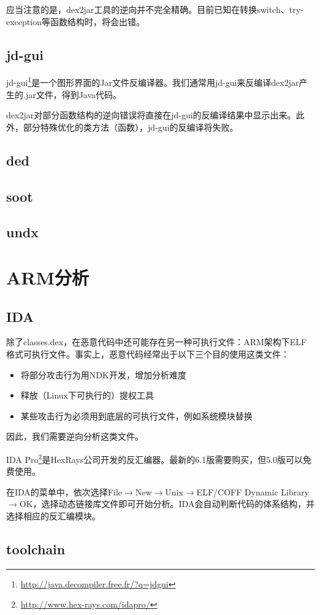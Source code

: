 应当注意的是，dex2jar工具的逆向并不完全精确。目前已知在转换switch、try-exception等函数结构时，将会出错。
\subsection{jd-gui}
jd-gui\footnote{\url{http://java.decompiler.free.fr/?q=jdgui}}是一个图形界面的Jar文件反编译器。我们通常用jd-gui来反编译dex2jar产生的.jar文件，得到Java代码。

dex2jar对部分函数结构的逆向错误将直接在jd-gui的反编译结果中显示出来。此外，部分特殊优化的类方法（函数），jd-gui的反编译将失败。
\subsection{ded}
\subsection{soot}
\subsection{undx}

\section{ARM分析}
\subsection{IDA}
除了classes.dex，在恶意代码中还可能存在另一种可执行文件：ARM架构下ELF格式可执行文件。事实上，恶意代码经常出于以下三个目的使用这类文件：
\begin{itemize}
	\item 将部分攻击行为用NDK开发，增加分析难度
	\item 释放（Linux下可执行的）提权工具
	\item 某些攻击行为必须用到底层的可执行文件，例如系统模块替换
\end{itemize}
因此，我们需要逆向分析这类文件。

IDA Pro\footnote{\url{http://www.hex-rays.com/idapro/}}是Hex\-Rays公司开发的反汇编器。最新的6.1版需要购买，但5.0版可以免费使用。

在IDA的菜单中，依次选择File$\rightarrow$New$\rightarrow$Unix$\rightarrow$ELF/COFF Dynamic Library$\rightarrow$OK，选择动态链接库文件即可开始分析。IDA会自动判断代码的体系结构，并选择相应的反汇编模块。
\subsection{toolchain}

